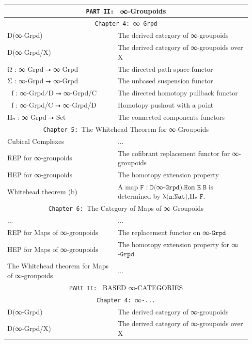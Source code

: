 \documentclass{book}
\theoremstyle{definition}
\begin{document}
{\begin{longtable}{|| l || l ||}
\hline \hline
\multicolumn{2}{||c||}{\texttt{PART II: } ∞-Groupoids} \\
\hline \hline 
\multicolumn{2}{||c||}{\texttt{Chapter 4: }∞\texttt{-Grpd}}\\
\hline \hline
D(∞-Grpd) & The derived category of ∞-groupoids \\
\hline
D(∞-Grpd/X) & The derived category of ∞-groupoids over X \\
\hline
Ω⃡ : ∞-Grpd ⭢ ∞-Grpd & The directed path space functor \\
 \hline 
Σ⃡ : ∞-Grpd ⭢ ∞-Grpd & The unbased suspension functor \\
 \hline 
ω⃡ f : ∞-Grpd⁄D ⭢ ∞-Grpd/C & The directed homotopy pullback functor\\
\hline 
σ⃡ f : ∞-Grpd/C ⭢ ∞-Grpd/D & Homotopy pushout with a point \\
 \hline 
Πₙ : ∞-Grpd ⭢ Set & The connected components functors\\
 \hline \hline
 \multicolumn{2}{||c||}{\texttt{Chapter 5: }The Whitehead Theorem for ∞-Groupoids} \\
\hline \hline
Cubical Complexes & ...\\
\hline
REP for ∞-groupoids & The cofibrant replacement functor for ∞-groupoids\\
\hline
HEP for ∞-groupoids & The homotopy extension property\\
\hline
Whitehead theorem (b) & A map $\texttt{F : D(}$∞$\texttt{-Grpd).Hom E B}$ is determined by $\texttt{λ(n:Nat),}$Πₙ
$\texttt{F}$. \\
\hline \hline
\multicolumn{2}{||c||}{\texttt{Chapter 6: }The Category of Maps of ∞-Groupoids} \\
\hline \hline
... & ...\\
\hline
REP for Maps of ∞-groupoids & The replacement functor on ∞$\texttt{-Grpd}$ \\
\hline
HEP for Maps of ∞-groupoids & The homotopy extension property for ∞$\texttt{-Grpd}$\\
 \hline 
The Whitehead theorem for Maps of ∞-groupoids & ... \\
\hline \hline
\multicolumn{2}{||c||}{\texttt{PART II: } BASED ∞-CATEGORIES} \\
\hline \hline 
\multicolumn{2}{||c||}{\texttt{Chapter 4: }∞\texttt{-...}}\\
\hline \hline
D(∞-Grpd) & The derived category of ∞-groupoids \\
\hline
D(∞-Grpd/X) & The derived category of ∞-groupoids over X \\

\end{longtable}}
\end{document}
